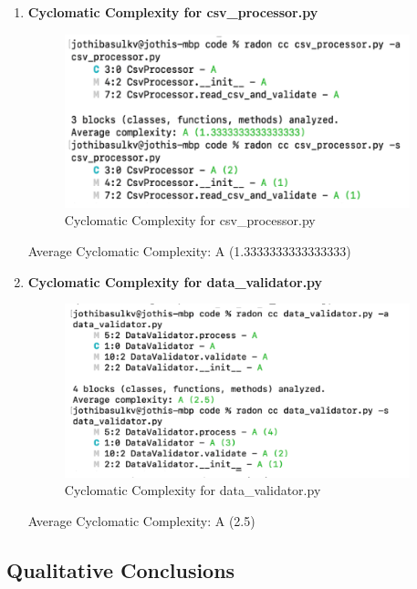 \begin{enumerate}
\item \textbf{Cyclomatic Complexity for csv\_processor.py}

\begin{figure}[!htb]
    \centering
    \includegraphics[width=10cm]{images/cc_csvprocessor.png}
    \caption{Cyclomatic Complexity for csv\_processor.py}
\end{figure}

Average Cyclomatic Complexity:  A (1.3333333333333333)\\

\pagebreak

\item \textbf{Cyclomatic Complexity for data\_validator.py}

\begin{figure}[!htb]
    \centering
    \includegraphics[width=10cm]{images/cc_datavalidator.png}
    \caption{Cyclomatic Complexity for data\_validator.py}
\end{figure}

Average Cyclomatic Complexity: A (2.5)
\end{enumerate}

\subsection{Qualitative Conclusions}

